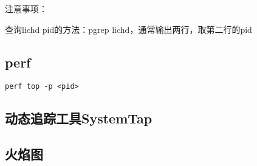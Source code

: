 注意事项：
\begin{compactenum}
\item 查询lichd pid的方法：pgrep lichd，通常输出两行，取第二行的pid
\end{compactenum}

\subsection{perf}

\begin{lstlisting}
perf top -p <pid> 
\end{lstlisting}

\subsection{动态追踪工具SystemTap}



\subsection{火焰图}
